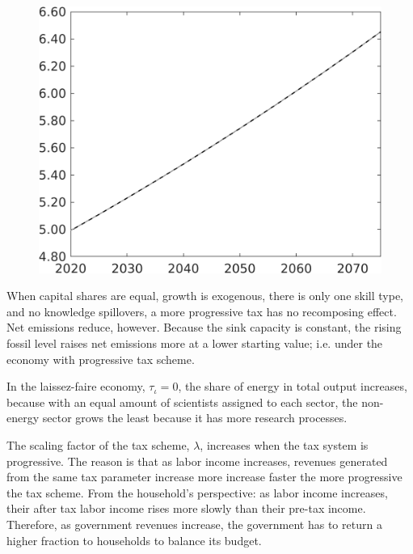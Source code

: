 \documentclass[12pt]{article}
\begin{document}
\begin{figure}[h!!]
\begin{minipage}[]{0.32\textwidth}
	\end{minipage}	
	\begin{minipage}[]{0.32\textwidth}
		\includegraphics[width=1\textwidth]{../../codding_model/own_basedOnFried/optimalPol_010922_revision/figures/all_13Sept22/CompTaul_Equlab_LFBAU_Reg0_An_spillover0_nsk1_xgr1_knspil1_sep1_countec0_GovRev0_etaa0.79_lgd0.png}
	\end{minipage}	
\end{figure}
When capital shares are equal, growth is exogenous, there is only one skill type, and no knowledge spillovers, a more progressive tax has no recomposing effect. Net emissions reduce, however. Because the sink capacity is constant, the rising fossil level raises net emissions more at a lower starting value; i.e. under the economy with progressive tax scheme. 

In the laissez-faire economy, $\tau_{\iota}=0$, the share of energy in total output increases, because with an equal amount of scientists assigned to each sector, the non-energy sector grows the least because it has more research processes. 

The scaling factor of the tax scheme, $\lambda$, increases when the tax system is progressive. The reason is that as labor income increases, revenues generated from the same tax parameter increase more increase faster the more progressive the tax scheme. From the household's perspective: as labor income increases, their after tax labor income rises more slowly than their pre-tax income. Therefore, as government revenues increase, the government has to return a higher fraction to households to balance its budget.
\end{document}
